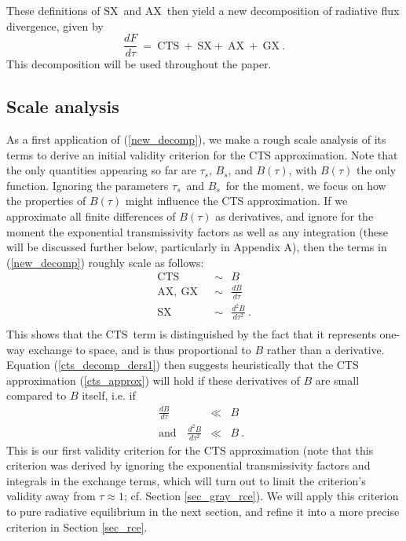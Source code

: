 \documentclass{ametsoc}
\newcommand{\beqn}{\begin{equation}}
\newcommand{\eeqn}{\end{equation}}
\newcommand{\beqa}{\begin{eqnarray}}
\newcommand{\eeqa}{\end{eqnarray}}
\newcommand{\eqnref}[1]{(\ref{#1})}
\newcommand{\der}[2]{\ensuremath{\frac{d #1}{d #2}}}
\newcommand{\ddtau}[1]{\ensuremath{\frac{d #1}{d\tau}}}
\newcommand{\taus}{\ensuremath{\tau_s}}
\newcommand{\Bs}{\ensuremath{B_s}}
\newcommand{\SX}{\ensuremath{\mathrm{SX}}}
\newcommand{\AX}{\ensuremath{\mathrm{AX}}}
\newcommand{\GX}{\ensuremath{\mathrm{GX}}}
\newcommand{\CTS}{\ensuremath{\mathrm{CTS}}}
\begin{document}
These definitions of \SX\ and \AX\ then yield a new decomposition of radiative flux divergence,  given by 
	\beqn
		\ddtau{F} \ = \ \CTS \ + \ \SX + \ \AX \ + \  \GX \  . 
		\label{new_decomp}
	\eeqn
This decomposition will be used throughout the paper.

\subsection{Scale analysis} \label{sec_scale}	
As a first application of \eqnref{new_decomp}, we make a rough scale analysis of its terms to derive an initial validity criterion for the CTS approximation. Note that the only quantities appearing so far are \taus, \Bs, and $B(\tau)$, with $B(\tau)$ the only function. Ignoring the parameters \taus\ and \Bs\ for the moment, we focus on how the properties of  $B(\tau)$ might influence the CTS approximation.  If we approximate all finite differences of $B(\tau)$ as derivatives, and ignore for the moment the exponential transmissivity factors  as well as any integration (these will be discussed further below, particularly in Appendix A), then the terms in \eqnref{new_decomp} roughly scale as follows:
\beqn
	\begin{split}
		\CTS \ & \ \sim \  \ B \\
		\AX, \ \GX	 \ & \ \sim \ \ \frac{d B}{d \tau} \\
		\SX	 \ & \ \sim \ \ \frac{d^2 B}{d \tau^2}  \ .\\
	\end{split}
	\label{cts_decomp_ders1}
\eeqn
This shows that the \CTS\ term is distinguished by the fact that it represents one-way exchange to space, and is thus proportional to $B$ rather than a derivative. Equation \eqnref{cts_decomp_ders1} then suggests heuristically that the CTS approximation \eqnref{cts_approx} will hold if these derivatives of $B$ are small compared to $B$ itself, i.e. if 
\begin{subequations}
	\beqa
		\der{B}{\tau} &  \ll &  B \label{cts_dbdt} \quad  \\
		\text{and} \quad		\frac{d^2 B}{d \tau^2} & \ll & B \ . \label{cts_db2dt2}
	\eeqa
	\label{cts_criterion1}
\end{subequations}
This is our first  validity criterion for the CTS approximation (note that this criterion was derived by ignoring the exponential transmissivity factors  and integrals in the exchange terms, which will turn out to limit the criterion's validity away from $\tau\approx 1$; cf. Section \ref{sec_gray_rce}).  We will apply this criterion to pure radiative equilibrium in the next section, and refine it into a more precise criterion in Section \ref{sec_rce}. 
\end{document}
